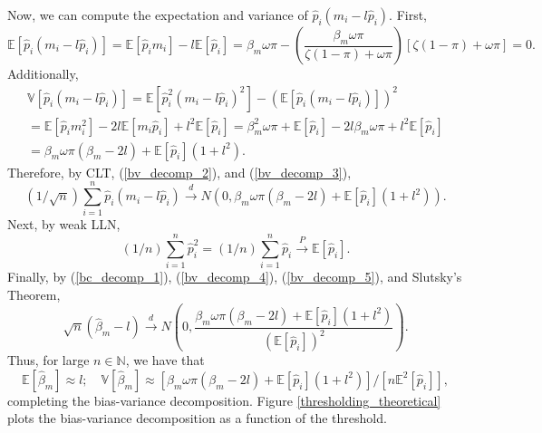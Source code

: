\documentclass[12pt]{article}
\begin{document}
\begin{appendices}
\begin{refsection}
		Now, we can compute the expectation and variance of $\hat{p}_i(m_i - l\hat{p}_i)$. First,
		\begin{equation}\label{bv_decomp_2}
		\mathbb{E}\left[\hat{p}_i(m_i - l\hat{p}_i) \right] = \mathbb{E}[\hat{p}_i m_i] - l \mathbb{E}[\hat{p}_i] = \beta_m \omega \pi - \left(\frac{\beta_m \omega \pi}{\zeta (1-\pi) + \omega \pi}\right)[\zeta (1-\pi) + \omega \pi] = 0.
		\end{equation}
		Additionally,
		\begin{multline}\label{bv_decomp_3}
		\mathbb{V}\left[\hat{p}_i(m_i - l\hat{p}_i)\right] = \mathbb{E}\left[\hat{p}_i^2(m_i - l\hat{p}_i)^2\right] - (\mathbb{E}\left[ \hat{p}_i(m_i - l\hat{p}_i)\right])^2 \\ = \mathbb{E}\left[ \hat{p}_i m_i^2\right] - 2l \mathbb{E}[m_i\hat{p}_i] +l^2 \mathbb{E}[\hat{p}_i]= \beta^2_m \omega \pi + \mathbb{E}[ \hat{p}_i] -2l \beta_m \omega \pi + l^2 \mathbb{E}[\hat{p}_i] \\ = \beta_m\omega\pi(\beta_m - 2l) + \mathbb{E}[\hat{p}_i](1 + l^2).
		\end{multline}
		Therefore, by CLT, (\ref{bv_decomp_2}), and (\ref{bv_decomp_3}),
		\begin{equation}\label{bv_decomp_4}
		(1/\sqrt{n})\sum_{i=1}^n \hat{p}_i(m_i - l \hat{p}_i) \xrightarrow{d} N\left(0, \beta_m\omega\pi(\beta_m - 2l) + \mathbb{E}[\hat{p}_i](1 + l^2) \right).
		\end{equation}
		Next, by weak LLN,
		\begin{equation}\label{bv_decomp_5}
		(1/n) \sum_{i=1}^n \hat{p}_i^2 = (1/n) \sum_{i=1}^n \hat{p}_i \xrightarrow{P} \mathbb{E}[\hat{p}_i].
		\end{equation}
		Finally, by (\ref{bc_decomp_1}), (\ref{bv_decomp_4}), (\ref{bv_decomp_5}), and Slutsky's Theorem,
		$$ \sqrt{n}(\hat{\beta}_m - l) \xrightarrow{d} N\left(0, \frac{ \beta_m\omega\pi(\beta_m - 2l) + \mathbb{E}[\hat{p}_i](1 + l^2) }{\left(\mathbb{E}[\hat{p}_i]\right)^2} \right).$$ Thus, for large $n \in \mathbb{N}$, we have that 
		$$
		\mathbb{E} [\hat{\beta}_m] \approx l; \quad
		\mathbb{V}[\hat{\beta}_m] \approx \left[\beta_m\omega\pi(\beta_m - 2l) + \mathbb{E}[\hat{p}_i](1 + l^2)\right]/[n\mathbb{E}^2[\hat{p}_i]],$$
		completing the bias-variance decomposition. Figure \ref{thresholding_theoretical} plots the bias-variance decomposition as a function of the threshold.
	

\end{refsection}
\end{appendices}
\end{document}
